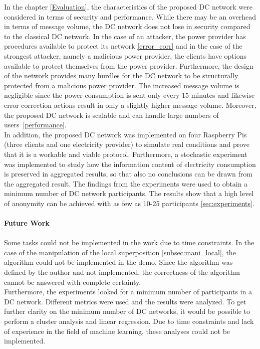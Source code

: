 In the chapter \ref{Evaluation}, the characteristics of the proposed DC network were considered in terms of security and performance. While there may be an overhead in terms of message volume, the DC network does not lose in security compared to the classical DC network. In the case of an attacker, the power provider has procedures available to protect its network \ref{error_corr} and in the case of the strongest attacker, namely a malicious power provider, the clients have options available to protect themselves from the power provider. Furthermore, the design of the network provides many hurdles for the DC network to be structurally protected from a malicious power provider. The increased message volume is negligible since the power consumption is sent only every 15 minutes and likewise error correction actions result in only a slightly higher message volume. Moreover, the proposed DC network is scalable and can handle large numbers of users~\ref{performance}.\\
In addition, the proposed DC network was implemented on four Raspberry Pis (three clients and one electricity provider) to simulate real conditions and prove that it is a workable and viable protocol. Furthermore, a stochastic experiment was implemented to study how the information content of electricity consumption is preserved in aggregated results, so that also no conclusions can be drawn from the aggregated result. The findings from the experiments were used to obtain a minimum number of DC network participants. The results show that a high level of anonymity can be achieved with as few as 10-25 participants \ref{sec:experiments}. \\
\\
\textbf{Future Work}
\\
\\
Some tasks could not be implemented in the work due to time constraints. In the case of the manipulation of the local superposition \ref{subsec:mani_local}, the algorithm could not be implemented in the demo. Since the algorithm was defined by the author and not implemented, the correctness of the algorithm cannot be answered with complete certainty. \\
Furthermore, the experiments looked for a minimum number of participants in a DC network. Different metrics were used and the results were analyzed. To get further clarity on the minimum number of DC networks, it would be possible to perform a cluster analysis and linear regression. Due to time constraints and lack of experience in the field of machine learning, these analyses could not be implemented.





\cleardoublepage

